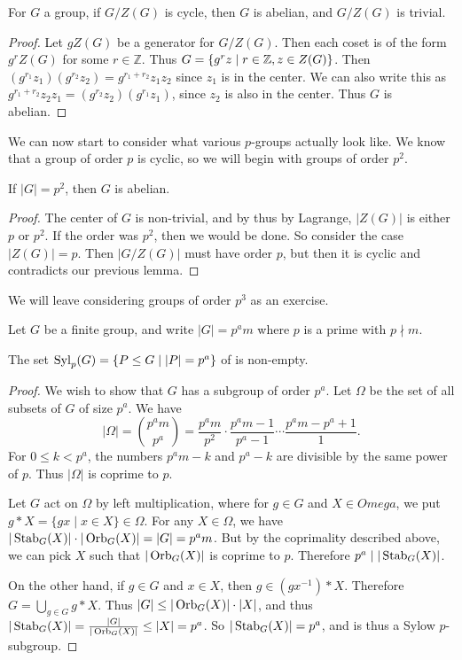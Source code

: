 \documentclass[a4paper]{scrartcl}
\begin{document}
\begin{lemma}
	For $G$ a group, if $G/Z(G)$ is cycle, then $G$ is abelian, and $G/Z(G)$ is trivial.
\end{lemma}
\begin{proof}
	Let $gZ(G)$ be a generator for $G/Z(G)$. Then each coset is of the form $g^r Z(G)$ for some $r \in \mathbb{Z}$. Thus $G = \{g^r z \mid r \in \mathbb{Z}, z \in Z(G) \}$.
	Then $(g^{r_1} z_1)(g^{r_2}z_2) = g^{r_1 + r_2} z_1 z_2$ since $z_1$ is in the center.
	We can also write this as $g^{r_1 + r_2}z_2 z_1 =  (g^{r_2} z_2)(g^{r_1} z_1)$, since $z_2$ is also in the center. Thus $G$ is abelian.
\end{proof}

We can now start to consider what various $p$-groups actually look like. We know that a group of order $p$ is cyclic, so we will begin with groups of order $p^2$.

\begin{corollary}
	If $|G| = p^2$, then $G$ is abelian.
\end{corollary}
\begin{proof}
	The center of $G$ is non-trivial, and by thus by Lagrange, $|Z(G)|$ is either $p$ or $p^2$. If the order was $p^2$, then we would be done. So consider the case $|Z(G)| = p$. Then $|G/Z(G)|$ must have order $p$, but then it is cyclic and contradicts our previous lemma.
\end{proof}

We will leave considering groups of order $p^3$ as an exercise.


Let $G$ be a finite group, and write $|G| = p^a m$ where $p$ is a prime with $p \nmid m$.

\begin{theorem}
	The set $\operatorname{Syl}_p(G) = \{P \leq G \mid |P| = p^a \}$ of  is non-empty.
\end{theorem}
\begin{proof}
	We wish to show that $G$ has a subgroup of order $p^a$.
	Let $\Omega$ be the set of all subsets of $G$ of size $p^a$.
	We have
	$$
	|\Omega| = \binom{p^a m}{p^a} = \frac{p^a m}{p^2} \cdot \frac{p^a m - 1}{p^a - 1} \cdots \frac{p^a m - p^a + 1}{1}.
	$$
	For $0 \leq k < p^a$, the numbers $p^am - k$ and $p^a  -k$ are divisible by the same power of $p$. Thus $|\Omega|$ is coprime to $p$.

	Let $G$ act on $\Omega$ by left multiplication, where for $g \in G
$ and $X \in Omega$, we put $g*X = \{gx \mid x \in X\} \in \Omega$. For any $X \in \Omega$, we have $|\operatorname{Stab}_G(X)| \cdot |\operatorname{Orb}_G(X)| = |G| = p^a m$. But by the coprimality described above, we can pick $X$ such that $|\operatorname{Orb}_G(X)|$ is coprime to $p$. Therefore $p^a \mid |\operatorname{Stab}_G(X)|$.

On the other hand, if $g \in G$ and $x \in X$, then $g \in (g x^{-1}) * X$. Therefore $G = \bigcup_{g \in G} g*X$. Thus $|G| \leq |\operatorname{Orb}_G(X)| \cdot |X|$, and thus $|\operatorname{Stab}_G(X)| = \frac{|G|}{|\operatorname{Orb}_G(X)|} \leq |X| = p^a$. So $|\operatorname{Stab}_G(X)| = p^a$, and is thus a Sylow $p$-subgroup.
\end{proof}
\end{document}
